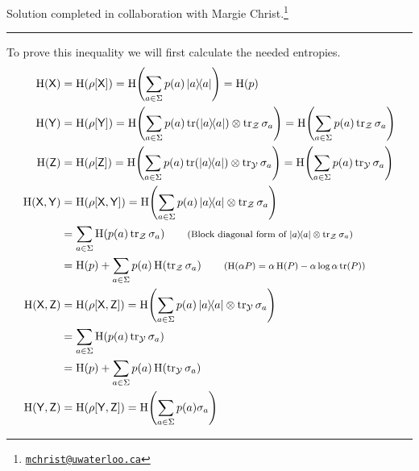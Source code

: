 \documentclass[boxes,pages,color=SeaGreen]{homework}
\newcommand{\collab}[1]{\footnote{\href{mailto:#1}{\texttt{#1}}}}
\newcommand{\Y}{\mathcal{Y}}
\newcommand{\Z}{\mathcal{Z}}
\newcommand{\reg}[1]{\mathsf{#1}}
\newcommand{\ent}{\operatorname{H}}
\newcommand{\smalltag}[1]{\tag*{\footnotesize (#1)}}
\begin{document}
\noindent Solution completed in collaboration with Margie Christ.\collab{mchrist@uwaterloo.ca}

{\noindent\color{SeaGreen!30}\rule{\textwidth}{1.5pt}}

\begin{solution}
    To prove this inequality we will first calculate the needed entropies.
    \begin{align*}
        \ent(\reg{X})          & = \ent(\rho[\reg{X}]) = \ent\!\qty(\sum_{a \in \Sigma} p(a)\ketbra{a}) = \ent(p)                                                                         \\
        \ent(\reg{Y})          & = \ent(\rho[\reg{Y}]) = \ent\!\qty(\sum_{a \in \Sigma} p(a)\tr(\ketbra{a})\otimes \tr_\Z\sigma_a) = \ent\!\qty(\sum_{a \in \Sigma} p(a) \tr_\Z \sigma_a) \\
        \ent(\reg{Z})          & = \ent(\rho[\reg{Z}]) = \ent\!\qty(\sum_{a \in \Sigma} p(a)\tr(\ketbra{a})\otimes \tr_\Y\sigma_a) = \ent\!\qty(\sum_{a \in \Sigma} p(a) \tr_\Y \sigma_a) \\
        \ent(\reg{X}, \reg{Y}) & = \ent(\rho[\reg{X}, \reg{Y}]) = \ent\!\qty(\sum_{a \in \Sigma} p(a) \ketbra{a}\otimes \tr_\Z\sigma_a)                                                   \\
                               & = \sum_{a \in \Sigma}\ent(p(a) \tr_\Z\sigma_a)           \smalltag{Block diagonal form of $\ketbra{a}\otimes\tr_\Z\sigma_a$}                             \\
                               & = \ent(p) + \sum_{a \in \Sigma} p(a)\ent(\tr_\Z\sigma_a) \smalltag{$\ent(\alpha P) = \alpha \ent(P) - \alpha \log\alpha \tr(P)$}                         \\
        \ent(\reg{X}, \reg{Z}) & = \ent(\rho[\reg{X}, \reg{Z}]) = \ent\!\qty(\sum_{a \in \Sigma} p(a) \ketbra{a}\otimes \tr_\Y\sigma_a)                                                   \\
                               & = \sum_{a \in \Sigma}\ent(p(a) \tr_\Y\sigma_a)                                                                                                           \\
                               & = \ent(p) + \sum_{a \in \Sigma} p(a)\ent(\tr_\Y\sigma_a)                                                                                                 \\
        \ent(\reg{Y}, \reg{Z}) & = \ent(\rho[\reg{Y}, \reg{Z}]) = \ent\!\qty(\sum_{a \in \Sigma} p(a) \sigma_a)

\end{align*}
\end{solution}
\end{document}
